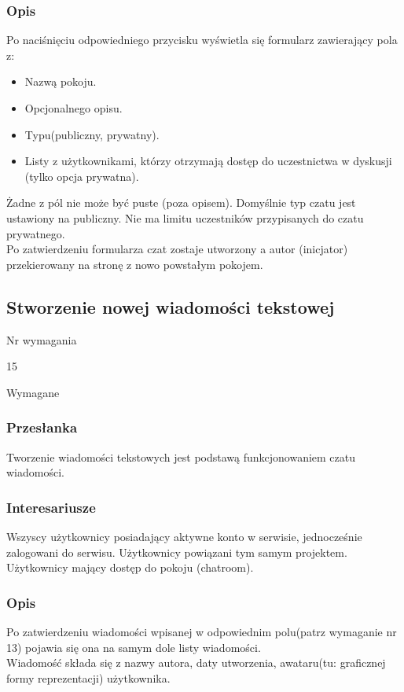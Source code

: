 \documentclass[eng,printmode]{mgr}
\begin{document}
\subsubsection{Opis}
Po naciśnięciu odpowiedniego przycisku wyświetla się formularz zawierający pola z:
\begin{itemize}
  \item[--] Nazwą pokoju.
  \item[--] Opcjonalnego opisu.
  \item[--] Typu(publiczny, prywatny).
  \item[--] Listy z użytkownikami, którzy otrzymają dostęp do uczestnictwa w dyskusji (tylko opcja prywatna).
\end{itemize}
Żadne z pól nie może być puste (poza opisem). Domyślnie typ czatu jest ustawiony na publiczny. Nie ma limitu uczestników przypisanych do czatu prywatnego.
\\
Po zatwierdzeniu formularza czat zostaje utworzony a autor (inicjator) przekierowany na stronę z nowo powstałym pokojem.

\subsection{Stworzenie nowej wiadomości tekstowej}
\begin{labeling}{Nr wymagania}
\item [Nr wymagania:] 15
\item [Priorytet:] Wymagane
\end{labeling}

\subsubsection{Przesłanka}
Tworzenie wiadomości tekstowych jest podstawą funkcjonowaniem czatu wiadomości.

\subsubsection{Interesariusze}
Wszyscy użytkownicy posiadający aktywne konto w serwisie, jednocześnie zalogowani do serwisu. Użytkownicy powiązani tym samym projektem. Użytkownicy mający dostęp do pokoju (chatroom).

\subsubsection{Opis}
Po zatwierdzeniu wiadomości wpisanej w odpowiednim polu(patrz wymaganie nr 13) pojawia się ona na samym dole listy wiadomości.
\\
Wiadomość składa się z nazwy autora, daty utworzenia, awataru(tu: graficznej formy reprezentacji) użytkownika.
\end{document}
